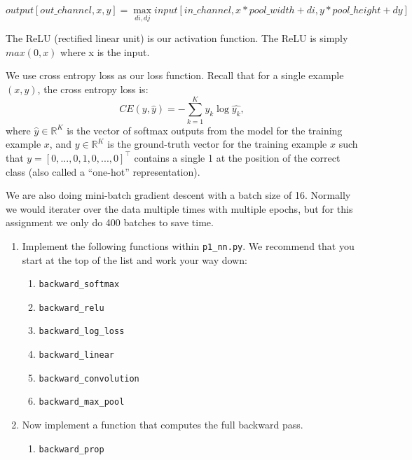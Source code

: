 $$
output[out\_channel, x, y] = 
    \max_{di, dj} input[in\_channel, x * pool\_width + di, y * pool\_height + dy]
$$

The ReLU (rectified linear unit) is our activation function.
The ReLU is simply $max(0, x)$ where x is the input.

We use cross entropy loss as our loss function. Recall that for a single example $(x, y)$, the cross
entropy loss is:
$$CE(y, \hat{y}) = - \sum_{k=1}^K y_k \log \hat{y_k},$$
where $\hat{y} \in \mathbb{R}^{K}$ is the vector of softmax outputs
from the model for the training example $x$,
and $y \in \mathbb{R}^{K}$ is the ground-truth vector for the training example
$x$ such that $y = [0,...,0,1,0,...,0]^\top$ contains a single 1 at the
position of the correct class (also called a ``one-hot'' representation).

We are also doing mini-batch gradient descent with a batch size of 16. Normally we would iterater over the data multiple times with multiple epochs, but for this assignment we only do 400 batches to save time.

\begin{enumerate}
\item {}

Implement the following functions within \texttt{p1\_nn.py}. We recommend that you start at the top of the list and work your way down:

\begin{enumerate}
\item \texttt{backward\_softmax}
\item \texttt{backward\_relu}
\item \texttt{backward\_log\_loss}
\item \texttt{backward\_linear}
\item \texttt{backward\_convolution} 
\item \texttt{backward\_max\_pool}

\end{enumerate}

\item {}
Now implement a function that computes the full backward pass.

\begin{enumerate}

\item \texttt{backward\_prop}

\end{enumerate}

\end{enumerate}
